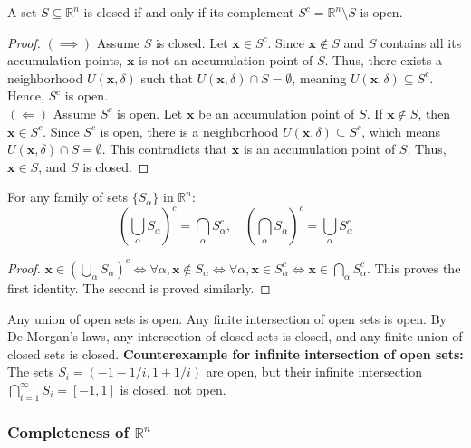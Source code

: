 \begin{theorem}
A set $S \subseteq \mathbb{R}^n$ is closed if and only if its complement $S^c = \mathbb{R}^n \setminus S$ is open.
\end{theorem}
\begin{proof}
$(\implies)$ Assume $S$ is closed. Let $\mathbf{x} \in S^c$. Since $\mathbf{x} \notin S$ and $S$ contains all its accumulation points, $\mathbf{x}$ is not an accumulation point of $S$. Thus, there exists a neighborhood $U(\mathbf{x}, \delta)$ such that $U(\mathbf{x}, \delta) \cap S = \emptyset$, meaning $U(\mathbf{x}, \delta) \subseteq S^c$. Hence, $S^c$ is open. \\
$(\Longleftarrow)$ Assume $S^c$ is open. Let $\mathbf{x}$ be an accumulation point of $S$. If $\mathbf{x} \notin S$, then $\mathbf{x} \in S^c$. Since $S^c$ is open, there is a neighborhood $U(\mathbf{x}, \delta) \subseteq S^c$, which means $U(\mathbf{x}, \delta) \cap S = \emptyset$. This contradicts that $\mathbf{x}$ is an accumulation point of $S$. Thus, $\mathbf{x} \in S$, and $S$ is closed.
\end{proof}

\begin{theorem}
For any family of sets $\{S_\alpha\}$ in $\mathbb{R}^n$:
\[ \left( \bigcup_\alpha S_\alpha \right)^c = \bigcap_\alpha S_\alpha^c, \quad \left( \bigcap_\alpha S_\alpha \right)^c = \bigcup_\alpha S_\alpha^c \]
\end{theorem}
\begin{proof}
$\mathbf{x} \in (\bigcup_\alpha S_\alpha)^c \iff \forall \alpha, \mathbf{x} \notin S_\alpha \iff \forall \alpha, \mathbf{x} \in S_\alpha^c \iff \mathbf{x} \in \bigcap_\alpha S_\alpha^c$. This proves the first identity. The second is proved similarly.
\end{proof}

\begin{property}
Any union of open sets is open. Any finite intersection of open sets is open.
By De Morgan's laws, any intersection of closed sets is closed, and any finite union of closed sets is closed.
\textbf{Counterexample for infinite intersection of open sets:} The sets $S_i = (-1 - 1/i, 1 + 1/i)$ are open, but their infinite intersection $\bigcap_{i=1}^{\infty} S_i = [-1, 1]$ is closed, not open.
\end{property}

\subsubsection{Completeness of \texorpdfstring{$\mathbb{R}^n$}{R n}}

